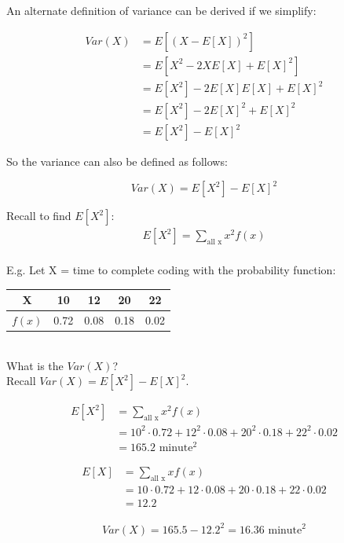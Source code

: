 \documentclass[12pt, letterpaper]{article}
\begin{document}
An alternate definition of variance can be derived if we simplify:

\begin{align*}
Var\left(X\right) &= E[(X - E[X])^2]\\
&= E[X^2 - 2XE[X] + E[X]^2]\\
&= E[X^2] -2E[X]E[X] + E[X]^2\\
&= E[X^2] -2E[X]^2 + E[X]^2\\
&= E[X^2] - E[X]^2
\end{align*}

So the variance can also be defined as follows:

\begin{equation}
Var\left(X\right) = E[X^2] - E[X]^2
\end{equation}

Recall to find \(E[X^2]\):
\begin{align*}
E[X^2] = \sum_{\text{all x}} x^2 f\left(x\right)
\end{align*}\\

E.g. Let X = time to complete coding with the probability function:\\

\begin{tabular}{|c|c|c|c|c|}
\hline
X & 10 & 12 & 20 & 22\\ 
\hline
$f\left(x\right)$ & 0.72 & 0.08 & 0.18 & 0.02\\
\hline
\end{tabular}\\

What is the \(Var\left(X\right)\)?\\

Recall \(Var\left(X\right) = E[X^2] - E[X]^2\).

\begin{align*}
E[X^2] &= \sum_{\text{all x}}x^2 f\left(x\right)\\
&= 10^2 \cdot 0.72 + 12^2 \cdot 0.08 + 20^2 \cdot 0.18 + 22^2 \cdot 0.02\\
&= 165.2 \text{ minute}^2
\end{align*}

\begin{align*}
E[X] &= \sum_{\text{all x}} xf\left(x\right)\\
&= 10 \cdot 0.72 + 12 \cdot 0.08 + 20 \cdot 0.18 + 22 \cdot 0.02\\
&= 12.2
\end{align*}

\begin{align*}
Var\left(X\right) = 165.5 - 12.2^2 = 16.36 \text{ minute}^2
\end{align*}
\end{document}
